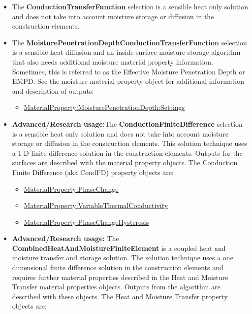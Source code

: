 \begin{itemize}
    \item
    The \textbf{ConductionTransferFunction} selection is a sensible heat only solution and does not take into account moisture storage or diffusion in the construction elements.
    \item
    The \textbf{MoisturePenetrationDepthConductionTransferFunction} selection is a sensible heat diffusion and an inside surface moisture storage algorithm that also needs additional moisture material property information. Sometimes, this is referred to as the Effective Moisture Penetration Depth or EMPD. See the moisture material property object for additional information and description of outputs:
    \begin{itemize}
        \item
        \hyperref[materialpropertymoisturepenetrationdepthsettings]{MaterialProperty:MoisturePenetrationDepth:Settings}
    \end{itemize}
    \item
    \textbf{Advanced/Research usage:}The \textbf{ConductionFiniteDifference} selection is a sensible heat only solution and does not take into account moisture storage or diffusion in the construction elements. This solution technique uses a 1-D finite difference solution in the construction elements. Outputs for the surfaces are described with the material property objects. The Conduction Finite Difference (aka CondFD) property objects are:
    \begin{itemize}
        \item
        \hyperref[materialpropertyphasechange]{MaterialProperty:PhaseChange}
        \item
        \hyperref[materialpropertyvariablethermalconductivity]{MaterialProperty:VariableThermalConductivity}
        \item
        \hyperref[materialpropertyphasechangehysteresis]{MaterialProperty:PhaseChangeHysteresis}
    \end{itemize}
    \item
    \textbf{Advanced/Research usage:} The \textbf{CombinedHeatAndMoistureFiniteElement} is a coupled heat and moisture transfer and storage solution. The solution technique uses a one dimensional finite difference solution in the construction elements and requires further material properties described in the Heat and Moisture Transfer material properties objects. Outputs from the algorithm are described with these objects. The Heat and Moisture Transfer property objects are:

\end{itemize}
